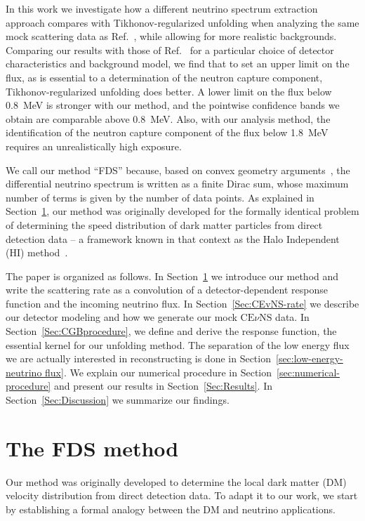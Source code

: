 \documentclass[a4paper,11pt]{article}
\renewcommand\({\left(}
\renewcommand\){\right)}
\renewcommand\[{\left[}
\renewcommand\]{\right]}
\theoremstyle{definition}
\newcommand{\CEnNS}{\text{CE}\nu\text{NS}}
\begin{document}
In this work we investigate how a different neutrino spectrum extraction approach  compares with Tikhonov-regularized unfolding when analyzing the same mock scattering data as Ref.~\cite{Liao:2023kyy}, while allowing for more realistic backgrounds. Comparing our results with those of Ref.~\cite{Liao:2023kyy} for a particular choice of detector characteristics and background model, we find that to set an upper limit on the flux, as is essential to a determination of the neutron capture component, Tikhonov-regularized unfolding does better.  A lower limit on the flux below 0.8~MeV
is stronger with our method, and the pointwise confidence bands we obtain are comparable above 0.8~MeV. Also, with our analysis method, the identification of the neutron capture component of the flux below 1.8~MeV requires an unrealistically high exposure.

We call our method ``FDS'' because, based on  convex geometry arguments~\cite{Gelmini:2017aqe}, the differential neutrino spectrum is written as a finite Dirac sum, whose maximum number of terms is given by the number of data points.  As explained in Section~\ref{Sec:our-method}, our method was originally developed  for the   formally identical problem of determining the speed distribution of dark matter particles from direct detection data -- a framework known in that context as the Halo Independent (HI) method~\cite{Fox:2010bz,Fox:2011qd,Frandsen:2011gi,Gondolo:2012rs,Gelmini:2017aqe}.

The paper is organized as follows. In Section~\ref{Sec:our-method} we introduce our method and write the scattering rate as a convolution of a detector-dependent response function and the incoming neutrino flux. In Section~\ref{Sec:CEvNS-rate} we describe our detector modeling and how we generate our mock $\CEnNS$ data.
In Section~\ref{Sec:CGBprocedure}, we define and derive the response function, the essential kernel for our unfolding method. The separation of the low energy flux we are actually interested in reconstructing is done in Section~\ref{sec:low-energy-neutrino flux}. We explain our numerical procedure in Section~\ref{sec:numerical-procedure} and present our results in Section~\ref{Sec:Results}.
In Section~\ref{Sec:Discussion} we summarize our findings. 


\section{The FDS method}
\label{Sec:our-method}  

Our method was originally developed to determine the local dark matter (DM) velocity distribution from direct detection data. To adapt it to our work, we start by establishing a formal analogy between the DM and neutrino applications.
\end{document}
